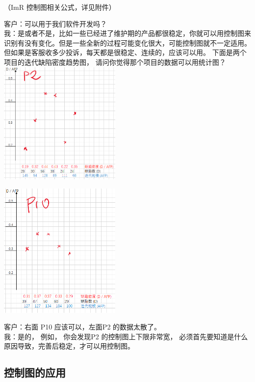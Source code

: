 （ImR 控制图相关公式，详见附件）

客户：可以用于我们软件开发吗？\\
我：是或者不是，比如一些已经进了维护期的产品都很稳定，你就可以用控制图来识别有没有变化。但是一些全新的过程可能变化很大，可能控制图就不一定适用。但如果是客服收多少投诉，每天都是很稳定、连续的，应该可以用。
下面是两个项目的迭代缺陷密度趋势图，
请问你觉得那个项目的数据可以用统计图？\\

\includegraphics[width=6cm]{P2CcScreenshot_2021-09-25_111304.png}

\includegraphics[width=6cm]{P10CcScreenshot_2021-09-25_104057.png}

客户：右面 P10 应该可以，左面P2 的数据太散了。\\
我：是的， 例如， 你会发现P2 的控制图上下限非常宽，
必须首先要知道是什么原因导致，完善后稳定，才可以用控制图。\\

\hypertarget{ux63a7ux5236ux56feux7684ux5e94ux7528}{%
\subsection{控制图的应用}\label{ux63a7ux5236ux56feux7684ux5e94ux7528}}

